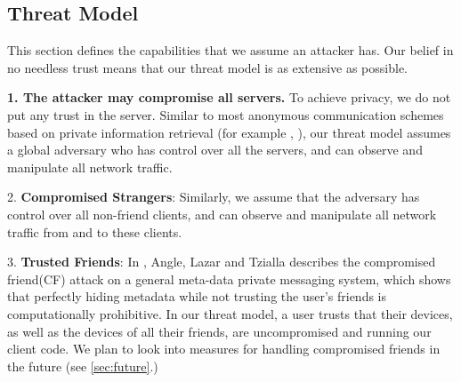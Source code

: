 \subsection{Threat Model}
\label{subsec:threatmodel}

This section defines the capabilities that we assume an attacker has. Our belief in no needless trust means that our threat model is as extensive as possible.





\textbf{1. The attacker may compromise all servers.} To achieve privacy, we do not put any trust in the server. Similar to most anonymous communication schemes based on private information retrieval (for example \cite{ahmad2021addra}, ), our threat model assumes a global adversary who has control over all the servers, and can observe and manipulate all network traffic.

2. \textbf{Compromised Strangers}: Similarly, we assume that the adversary has control over all non-friend clients, and can observe and manipulate all network traffic from and to these clients.

3. \textbf{Trusted Friends}: In \cite{angel2018s}, Angle, Lazar and Tzialla describes the compromised friend(CF) attack on a general meta-data private messaging system, which shows that perfectly hiding metadata while not trusting the user's friends is computationally prohibitive. In our threat model, a user trusts that their devices, as well as the devices of all their friends, are uncompromised and running our client code. We plan to look into measures for handling compromised friends in the future (see \cref{sec:future}.)

